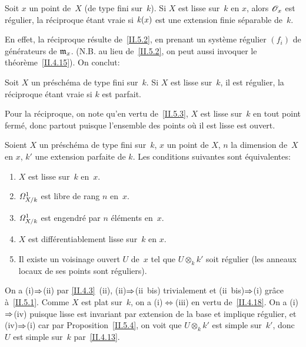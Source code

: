 \begin{corollaire}
\label{II.5.3}
Soit $x$ un point de~$X$ (de type fini sur~$k$). Si $X$ est lisse sur~$k$ en $x$, alors $\cal{O}_x$ est r\'egulier, la r\'eciproque
\'etant vraie si
$\kres(x)$
est une extension finie s\'eparable
de~$k$.
\end{corollaire}

En
effet, la r\'eciproque r\'esulte de~\ref{II.5.2}, en prenant un
syst\`eme r\'egulier $(f_i)$ de g\'en\'erateurs de
$\goth{m}_x$. (N.B. au lieu de~\ref{II.5.2}, on peut aussi invoquer le
th\'eor\`eme~\ref{II.4.15}). On conclut:

\begin{proposition}
\label{II.5.4}
Soit $X$ un pr\'esch\'ema de type fini sur~$k$. Si $X$ est lisse
sur~$k$, il est r\'egulier, la r\'eciproque \'etant vraie si $k$
est parfait.
\end{proposition}

Pour la r\'eciproque, on note qu'en vertu de~\ref{II.5.3}, $X$ est
lisse sur~$k$ en tout point ferm\'e, donc partout puisque l'ensemble
des points o\`u il est lisse est ouvert.

\begin{theoreme}
\label{II.5.5}
Soient $X$ un pr\'esch\'ema de type fini sur~$k$, $x$ un point de
$X$, $n$ la dimension de~$X$ en $x$, $k'$ une extension parfaite de
$k$. Les conditions suivantes sont \'equivalentes:
\begin{enumerate}
\item[(i)] $X$ est lisse sur~$k$ en~$x$.
\item[(ii)] $\it{\Omega}_{X/k}^1$ est libre de rang $n$ en~$x$.
\item[(ii~bis)] $\it{\Omega}_{X/k}^1$ est engendr\'e par $n$
\'el\'ements en~$x$.
\item[(iii)] $X$ est diff\'erentiablement lisse sur~$k$ en $x$.
\item[(iv)] Il existe un voisinage ouvert $U$ de~$x$ tel que
$U\otimes_k k'$ soit r\'egulier (\ie les anneaux locaux de ses
points sont r\'eguliers).
\end{enumerate}
\end{theoreme}

On a (i)$\To$(ii) par \ref{II.4.3}~(ii), (ii)$\To$(ii~bis) trivialement et (ii~bis)$\To$(i) gr\^ace
\`a~\ref{II.5.1}. Comme $X$ est plat sur~$k$, on a
(i)$\Leftrightarrow$(iii) en vertu de~\ref{II.4.18}. On a
(i)$\To$(iv) puisque lisse est invariant par extension de la
base et implique r\'egulier, et (iv)$\To$(i) car par
Proposition~\ref{II.5.4}, on voit que $U\otimes_k k'$ est simple sur~$k'$, donc $U$ est simple sur~$k$ par~\ref{II.4.13}.

